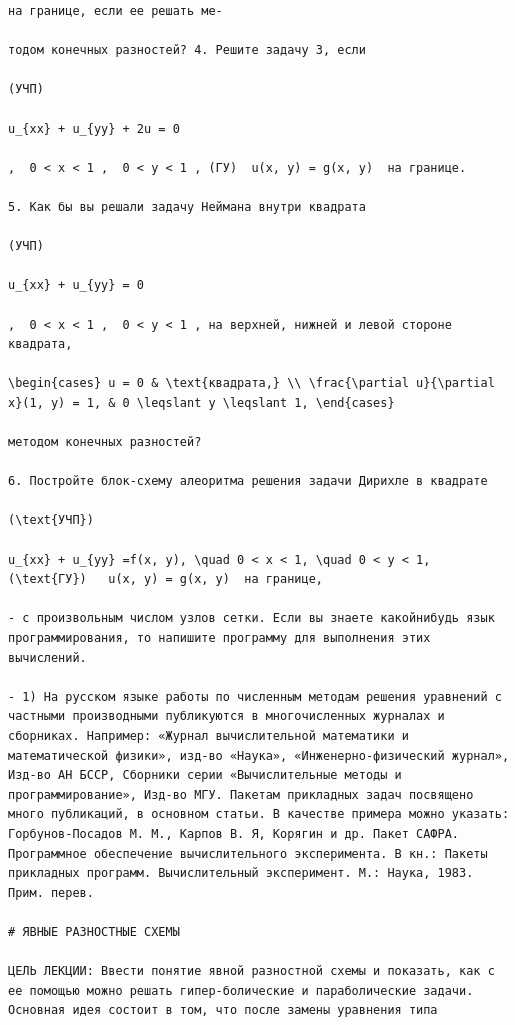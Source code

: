 \documentclass[
  ukrainian,
]{article}
\begin{document}
\begin{verbatim}
на границе, если ее решать ме-

тодом конечных разностей? 4. Решите задачу 3, если

(УЧП)

u_{xx} + u_{yy} + 2u = 0

,  0 < x < 1 ,  0 < y < 1 , (ГУ)  u(x, y) = g(x, y)  на границе.

5. Как бы вы решали задачу Неймана внутри квадрата

(УЧП)

u_{xx} + u_{yy} = 0

,  0 < x < 1 ,  0 < y < 1 , на верхней, нижней и левой стороне квадрата,

\begin{cases} u = 0 & \text{квадрата,} \\ \frac{\partial u}{\partial x}(1, y) = 1, & 0 \leqslant y \leqslant 1, \end{cases}

методом конечных разностей?

6. Постройте блок-схему алеоритма решения задачи Дирихле в квадрате

(\text{УЧП})

u_{xx} + u_{yy} =f(x, y), \quad 0 < x < 1, \quad 0 < y < 1, (\text{ГУ})   u(x, y) = g(x, y)  на границе,

- с произвольным числом узлов сетки. Если вы знаете какойнибудь язык программирования, то напишите программу для выполнения этих вычислений.

- 1) На русском языке работы по численным методам решения уравнений с частными производными публикуются в многочисленных журналах и сборниках. Например: «Журнал вычислительной математики и математической физики», изд-во «Наука», «Инженерно-физический журнал», Изд-во АН БССР, Сборники серии «Вычислительные методы и программирование», Изд-во МГУ. Пакетам прикладных задач посвящено много публикаций, в основном статьи. В качестве примера можно указать: Горбунов-Посадов М. М., Карпов В. Я, Корягин и др. Пакет САФРА. Программное обеспечение вычислительного эксперимента. В кн.: Пакеты прикладных программ. Вычислительный эксперимент. М.: Наука, 1983. Прим. перев.

# ЯВНЫЕ РАЗНОСТНЫЕ СХЕМЫ

ЦЕЛЬ ЛЕКЦИИ: Ввести понятие явной разностной схемы и показать, как с ее помощью можно решать гипер-болические и параболические задачи. Основная идея состоит в том, что после замены уравнения типа


\end{verbatim}
\end{document}

